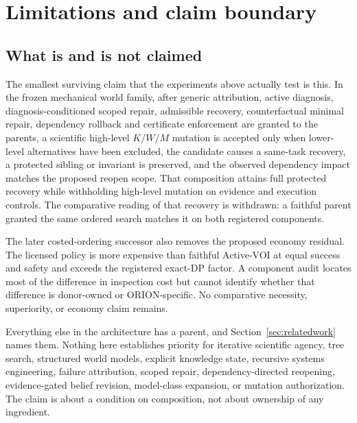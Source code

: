 \section{Limitations and claim boundary}
\label{sec:limitations}

\subsection{What is and is not claimed}

The smallest surviving claim that the experiments above actually test is this.
In the frozen mechanical world family, after generic attribution, active
diagnosis, diagnosis-conditioned scoped repair, admissible recovery,
counterfactual minimal repair, dependency rollback and certificate enforcement
are granted to the parents, a scientific high-level $K/W/M$ mutation is accepted
only when lower-level alternatives have been excluded, the candidate causes a
same-task recovery, a protected sibling or invariant is preserved, and the
observed dependency impact matches the proposed reopen scope. That composition
attains full protected recovery while withholding high-level mutation on evidence
and execution controls. The comparative reading of that recovery is withdrawn: a
faithful parent granted the same ordered search matches it on both registered
components.

The later costed-ordering successor also removes the proposed economy residual.
The licensed policy is more expensive than faithful Active-VOI at equal success
and safety and exceeds the registered exact-DP factor. A component audit locates
most of the difference in inspection cost but cannot identify whether that
difference is donor-owned or ORION-specific. No comparative necessity,
superiority, or economy claim remains.

Everything else in the architecture has a parent, and Section~\ref{sec:relatedwork}
names them. Nothing here establishes priority for iterative scientific agency,
tree search, structured world models, explicit knowledge state, recursive
systems engineering, failure attribution, scoped repair, dependency-directed
reopening, evidence-gated belief revision, model-class expansion, or mutation
authorization. The claim is about a condition on composition, not about
ownership of any ingredient.

